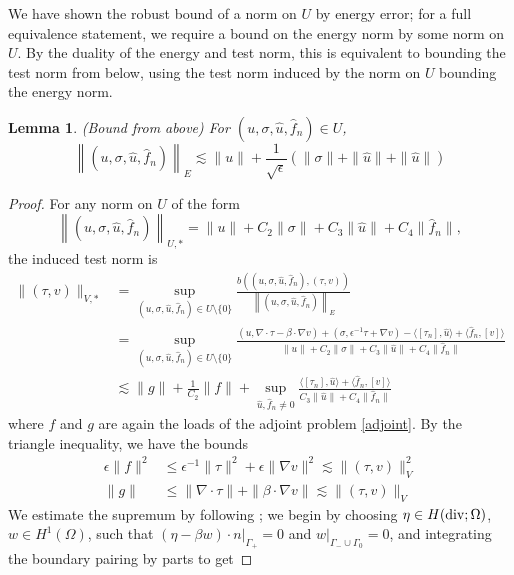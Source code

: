 \documentclass[11pt,onecolumn]{scrartcl}
\newcommand{\grad}{\nabla}
\renewcommand{\div}{\grad \cdot}
\newtheorem{lemma}{Lemma}
\begin{document}
We have shown the robust bound of a norm on $U$ by energy error; for a full equivalence statement, we require a bound on the energy norm by some norm on $U$.  By the duality of the energy and test norm, this is equivalent to bounding the test norm from below, using the test norm induced by the norm on $U$ bounding the energy norm.  
\begin{lemma}

(Bound from above) For $\left(u,\sigma,\widehat{u},\widehat{f}_n\right) \in U$,
\[
\left\|\left(u,\sigma,\widehat{u},\widehat{f}_n\right)\right\|_E \lesssim \|u\| + \frac{1}{\sqrt{\epsilon}}\left(\|\sigma\| + \|\widehat{u}\|+ \|\widehat{u}\|\right)
\]

\end{lemma}
\begin{proof}
For any norm on $U$ of the form
\[
\left\|\left(u,\sigma,\widehat{u},\widehat{f}_n\right)\right\|_{U,*} = \|u\| + C_2 \|\sigma\| + C_3 \|\widehat{u}\| + C_4 \|\widehat{f}_n\|,
\]
the induced test norm is  
\begin{align*}
\| \left(\tau,v\right) \|_{V,*} &= \sup_{\left(u,\sigma,\widehat{u},\widehat{f}_n\right) \in U\setminus \{0\}} \frac{b\left(\left(u,\sigma,\widehat{u},\widehat{f}_n\right),\left(\tau,v\right)\right)}{\left\|\left(u,\sigma,\widehat{u},\widehat{f}_n\right)\right\|_E} \\
& = \sup_{\left(u,\sigma,\widehat{u},\widehat{f}_n\right) \in U\setminus \{0\}} \frac{\left(u,\div \tau - \beta \cdot \grad v\right) + \left(\sigma, \epsilon^{-1} \tau + \grad v\right) - \langle \left[\tau_n\right], \widehat{u} \rangle + \langle \widehat{f}_n, \left[v\right] \rangle
}{\|u\| + C_2 \|\sigma\| + C_3 \|\widehat{u}\| + C_4 \|\widehat{f}_n\|} \\
&\lesssim \|g\| + \frac{1}{C_2}\|f\| + \sup_{\widehat{u},\widehat{f}_n \neq 0}\frac{\langle \left[\tau_n\right], \widehat{u} \rangle + \langle \widehat{f}_n, \left[v\right] \rangle}{C_3\|\widehat{u}\| + C_4\|\widehat{f}_n\|}
\end{align*}
where $f$ and $g$ are again the loads of the adjoint problem \eqref{adjoint}.  By the triangle inequality, we have the bounds
\begin{align*}
\epsilon \|f \|^2 &\leq \epsilon^{-1} \| \tau\|^2 + {\epsilon} \|\grad v\|^2 \lesssim \| \left(\tau,v\right)\|_V^2\\
\|g \| &\leq \|\div \tau\| +  \|\beta \cdot \grad v\| \lesssim \| \left(\tau,v\right)\|_V
\end{align*}
We estimate the supremum by following \cite{DPGrobustness}; we begin by choosing $\eta \in H({\rm div}; \Omega)$, $w\in H^1(\Omega)$, such that $\left.\left(\eta-\beta w \right)\cdot n\right |_{\Gamma_+} = 0$ and $\left.w\right |_{\Gamma_-\cup\Gamma_0} = 0$, and integrating the boundary pairing by parts to get

\end{proof}
\end{document}
